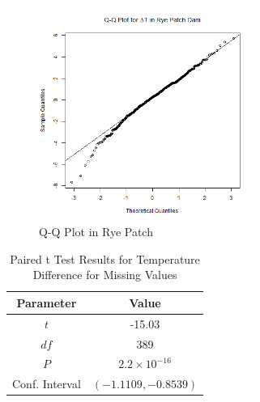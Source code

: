 \begin{figure}
  \centering
  \includegraphics[width=7cm]{../data/img/Rye_Patch_Diff_QQ_Plot.PNG}
  \caption{Q-Q Plot in Rye Patch}
  \label{fig:rp_diff_qqplot}
\end{figure}

\begin{table}[ht]
 \begin{centering}
 \caption{Temperature Difference Statistics for Missing Values}
 \label{tab:temp_diffs_missing}
 \end{centering}
\end{table}

\begin{table}[ht]
 \begin{centering}
 \begin{tabular}{|c|c|} 
  \hline
  Parameter & Value \\
  \hline\hline
  $t$ & -15.03 \\ 
 \hline
 $df$ & 389 \\
  \hline
 $P$ & $2.2 \times 10^{-16}$ \\ 
  \hline
 Conf. Interval & $(-1.1109, -0.8539)$ \\ 
 \hline
 \end{tabular}
 \caption{Paired t Test Results for Temperature Difference for Missing Values}
 \label{tab:t_test_results_missing}
 \end{centering}
\end{table}


